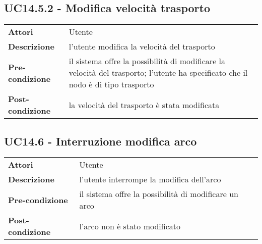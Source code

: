 \subsection{UC14.5.2 - Modifica velocità trasporto}
\label{sssec:UC14.5.2}
\def\arraystretch{1.5}
\begin{tabularx}{\textwidth}{l|p{}}
\rowcolor{I} \multicolumn{2}{c}{\color{white}\textbf{UC14.5.2 - Modifica velocità trasporto}} \\
\toprule
\endhead
\textbf{Attori} & Utente\\
\textbf{Descrizione} & l'utente modifica la velocità del trasporto\\
\textbf{Pre-condizione} & il sistema offre la possibilità di modificare la velocità del trasporto; l'utente ha specificato che il nodo è di tipo trasporto\\
\textbf{Post-condizione} & la velocità del trasporto è stata modificata\\
\bottomrule
\end{tabularx}
\subsection{UC14.6 - Interruzione modifica arco}
\label{sssec:UC14.6}
\def\arraystretch{1.5}
\begin{tabularx}{\textwidth}{l|p{}}
\rowcolor{I} \multicolumn{2}{c}{\color{white}\textbf{UC14.6 - Interruzione modifica arco}} \\
\toprule
\endhead
\textbf{Attori} & Utente\\
\textbf{Descrizione} & l'utente interrompe la modifica dell'arco\\
\textbf{Pre-condizione} & il sistema offre la possibilità di modificare un arco\\
\textbf{Post-condizione} & l'arco non è stato modificato\\
\bottomrule
\end{tabularx}
